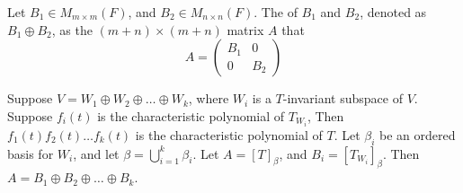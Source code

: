 \begin{definition}
    Let $B_1 \in M_{m \times m}(F)$, and $B_2 \in M_{n \times n} (F)$. The  of $B_1$ and $B_2$, denoted as $B_1 \oplus B_2$, as the $(m+n) \times (m+n)$ matrix $A$ that
    \begin{equation*}
        A = \begin{pmatrix}
            B_1 & 0 \\
            0 & B_2
        \end{pmatrix}
    \end{equation*}
\end{definition}


\begin{theorem}
    Suppose $V=W_1 \oplus W_2 \oplus \dots \oplus W_k$, where $W_i$ is a $T$-invariant subspace of $V$. Suppose $f_i(t)$ is the characteristic polynomial of $T_{W_i}$, Then $f_1(t) f_2(t) \dots f_k(t)$ is the characteristic polynomial of $T$. Let $\beta_i$ be an ordered basis for $W_i$, and let $\displaystyle \beta = \bigcup_{i=1}^k \beta_i$. Let $A=[T]_\beta$, and $B_i=[T_{W_i}]_\beta$. Then $A = B_1 \oplus B_2 \oplus \dots \oplus B_k$.
\end{theorem}